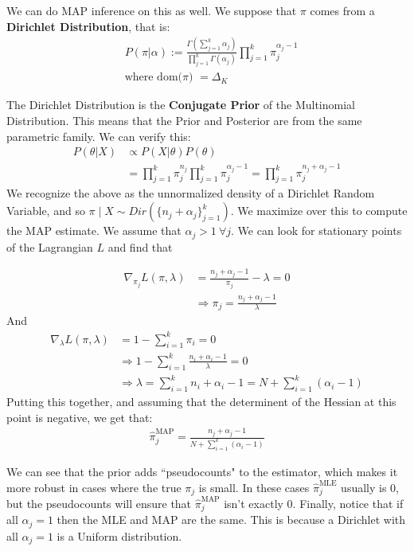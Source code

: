 \documentclass[]{article}
\theoremstyle{mattstyle}
\theoremstyle{definition}
\begin{document}
We can do MAP inference on this as well. We suppose that $\pi$ comes from a \textbf{Dirichlet Distribution}, that is:
\begin{align*}
&P(\pi|\alpha):=\frac{\Gamma\left(\sum_{j=1}^{k}\alpha_j\right)}{\prod_{j=1}^{k}\Gamma(\alpha_j)}\prod_{j=1}^{k}\pi_{j}^{\alpha_j-1}\\
&\text{where dom($\pi$) $=\Delta_K$}
\end{align*}

The Dirichlet Distribution is the \textbf{Conjugate Prior} of the Multinomial Distribution. This means that the Prior and Posterior are from the same parametric family. We can verify this:
\begin{align*}
P(\theta|X)&\propto P(X|\theta)P(\theta)\\
&= \prod_{j=1}^{k}\pi_{j}^{n_j}\prod_{j=1}^{k}\pi_{j}^{\alpha_j-1} = \prod_{j=1}^{k}\pi_{j}^{n_j + \alpha_j-1}
\end{align*}
We recognize the above as the unnormalized density of a Dirichlet Random Variable, and so $\pi \mid X \sim Dir\left(\{n_j + \alpha_j\}_{j=1}^k\right)$.
We maximize over this to compute the MAP estimate. We assume that $\alpha_j > 1 \ \forall j$. We can look for stationary points of the Lagrangian $L$ and find that

\begin{align*}
\nabla_{\pi_j} L(\pi, \lambda) &= \frac{n_j + \alpha_j -1}{\pi_j} - \lambda = 0 \\
&\Rightarrow \pi_j = \frac{n_j + \alpha_j -1}{\lambda}
\end{align*}
And
\begin{align*}
\nabla_{\lambda} L(\pi, \lambda) &= 1 - \sum_{i=1}^k \pi_i = 0 \\
&\Rightarrow 1 - \sum_{i=1}^k \frac{n_i + \alpha_i -1}{\lambda} = 0 \\
&\Rightarrow \lambda = \sum_{i=1}^k n_i + \alpha_i -1 = N + \sum_{i=1}^k (\alpha_i - 1)
\end{align*}
Putting this together, and assuming that the determinent of the Hessian at this point is negative, we get that:
\begin{align*}
\boxed{\hat{\pi}_{j}^{\text{MAP}} = \frac{n_j + \alpha_j -1}{N + \sum_{i=1}^k (\alpha_i - 1)}}
\end{align*}

We can see that the prior adds ``pseudocounts" to the estimator, which makes it more robust in cases where the true $\pi_j$ is small. In these cases $\hat{\pi}_{j}^{\text{MLE}}$ usually is $0$, but the pseudocounts will ensure that $\hat{\pi}_{j}^{\text{MAP}}$ isn't exactly 0. Finally, notice that if all $\alpha_j=1$ then the MLE and MAP are the same. This is because a Dirichlet with all $\alpha_j=1$ is a Uniform distribution.
\end{document}
